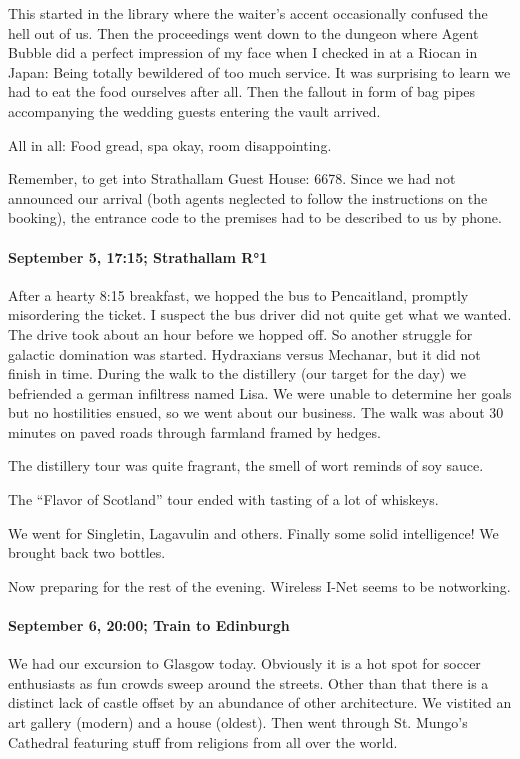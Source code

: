 This started in the library where the waiter's accent occasionally confused the hell out of us.
Then the proceedings went down to the dungeon where Agent Bubble did a perfect impression of my face when I checked in at a Riocan in Japan:
Being totally bewildered of too much service.
It was surprising to learn we had to eat the food ourselves after all.
Then the fallout in form of bag pipes accompanying the wedding guests entering the vault arrived.

All in all: Food gread, spa okay, room disappointing.

Remember, to get into Strathallam Guest House: 6678.
Since we had not announced our arrival (both agents neglected to follow the instructions on the booking), the entrance code to the premises had to be described to us by phone.

\paragraph{September 5, 17:15; Strathallam R°1}
After a hearty 8:15 breakfast, we hopped the bus to Pencaitland, promptly misordering the ticket.
I suspect the bus driver did not quite get what we wanted.
The drive took about an hour before we hopped off.
So another struggle for galactic domination was started.
Hydraxians versus Mechanar, but it did not finish in time.
During the walk to the distillery (our target for the day) we befriended a german infiltress named Lisa.
We were unable to determine her goals but no hostilities ensued, so we went about our business.
The walk was about 30 minutes on paved roads through farmland framed by hedges.

The distillery tour was quite fragrant, the smell of wort reminds of soy sauce.

The "`Flavor of Scotland"' tour ended with tasting of a lot of whiskeys.

We went for Singletin, Lagavulin and others.
Finally some solid intelligence!
We brought back two bottles.

Now preparing for the rest of the evening.
Wireless I-Net seems to be notworking.

\paragraph{September 6, 20:00; Train to Edinburgh}
We had our excursion to Glasgow today.
Obviously it is a hot spot for soccer enthusiasts as fun crowds sweep around the streets.
Other than that there is a distinct lack of castle offset by an abundance of other architecture.
We vistited an art gallery (modern) and a house (oldest).
Then went through St. Mungo's Cathedral featuring stuff from religions from all over the world.

